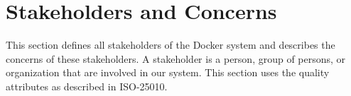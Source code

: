 
\clearpage
\chapter{Stakeholders and Concerns}
\label{ch:stakeholders}
This section defines all stakeholders of the Docker system and describes the concerns of these stakeholders. A stakeholder is a person, group of persons, or organization that are involved in our system. This section uses the quality attributes as described in ISO-25010\cite{iso25010}.


%



